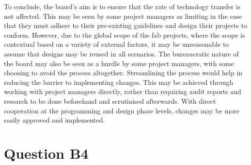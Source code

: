 \documentclass[11pt]{article}
\begin{document}
To conclude, the board's aim is to ensure that the rate of technology transfer is not affected. This may be seen by some project managers as limiting in the case that they must adhere to their pre-existing guidelines and design their projects to conform. However, due to the global scope of the fab projects, where the scope is contextual based on a variety of external factors, it may be unreasonable to assume that designs may be reused in all scenarios. The bureaucratic nature of the board may also be seen as a hurdle by some project managers, with some choosing to avoid the process altogether. Streamlining the process would help in reducing the barrier to implementing changes. This may be achieved through working with project managers directly, rather than requiring audit reports and research to be done beforehand and scrutinised afterwards. With direct cooperation at the programming and design phase levels, changes may be more easily approved and implemented.

\section*{Question B4}
\end{document}
